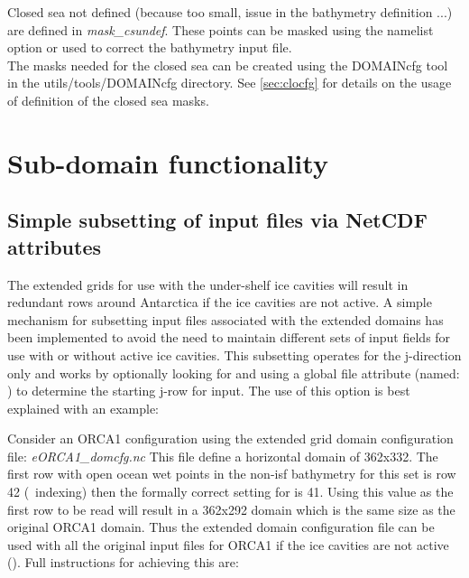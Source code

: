 \documentclass[../main/NEMO_manual]{subfiles}
\begin{document}
Closed sea not defined (because too small, issue in the bathymetry definition ...) are defined in \textit{mask\_csundef}.
These points can be masked using the namelist option  or used to correct the bathymetry input file.\\

The masks needed for the closed sea can be created using the DOMAINcfg tool in the utils/tools/DOMAINcfg directory.
See \autoref{sec:clocfg} for details on the usage of definition of the closed sea masks.

\section{Sub-domain functionality}
\label{sec:MISC_zoom}

\subsection{Simple subsetting of input files via NetCDF attributes}

The extended grids for use with the under-shelf ice cavities will result in redundant rows
around Antarctica if the ice cavities are not active.  A simple mechanism for subsetting
input files associated with the extended domains has been implemented to avoid the need to
maintain different sets of input fields for use with or without active ice cavities.  This
subsetting operates for the j-direction only and works by optionally looking for and using
a global file attribute (named: ) to determine the starting j-row
for input.  The use of this option is best explained with an example:
\medskip

\noindent Consider an ORCA1
configuration using the extended grid domain configuration file: \textit{eORCA1\_domcfg.nc}
This file define a horizontal domain of 362x332.  The first row with
open ocean wet points in the non-isf bathymetry for this set is row 42 (\fortran\ indexing)
then the formally correct setting for  is 41.  Using this value as
the first row to be read will result in a 362x292 domain which is the same size as the
original ORCA1 domain.  Thus the extended domain configuration file can be used with all
the original input files for ORCA1 if the ice cavities are not active (). Full instructions for achieving this are:
\end{document}
